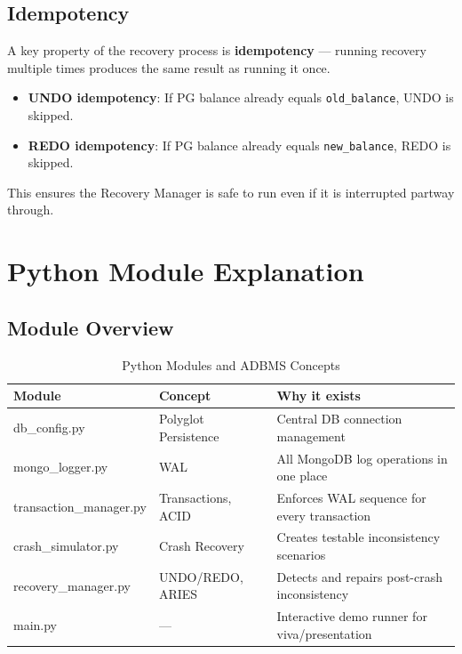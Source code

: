 \section{Idempotency}

A key property of the recovery process is \textbf{idempotency} --- running
recovery multiple times produces the same result as running it once.

\begin{itemize}
  \item \textbf{UNDO idempotency}: If PG balance already equals
        \texttt{old\_balance}, UNDO is skipped.
  \item \textbf{REDO idempotency}: If PG balance already equals
        \texttt{new\_balance}, REDO is skipped.
\end{itemize}

This ensures the Recovery Manager is safe to run even if it is interrupted
partway through.

\chapter{Python Module Explanation}

\section{Module Overview}

\begin{table}[H]
\centering
\caption{Python Modules and ADBMS Concepts}
\begin{tabularx}{\textwidth}{llX}
\toprule
\textbf{Module} & \textbf{Concept} & \textbf{Why it exists} \\
\midrule
db\_config.py & Polyglot Persistence & Central DB connection management \\
mongo\_logger.py & WAL & All MongoDB log operations in one place \\
transaction\_manager.py & Transactions, ACID & Enforces WAL sequence for every transaction \\
crash\_simulator.py & Crash Recovery & Creates testable inconsistency scenarios \\
recovery\_manager.py & UNDO/REDO, ARIES & Detects and repairs post-crash inconsistency \\
main.py & --- & Interactive demo runner for viva/presentation \\
\bottomrule
\end{tabularx}
\end{table}

